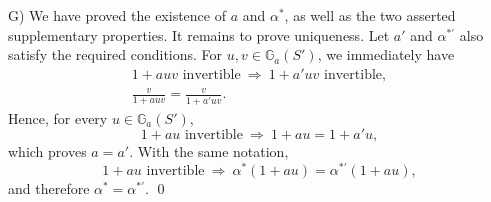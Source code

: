 \textup{G)} We have proved the existence of \(a\) and
\(\alpha^\ast\), as well as the two asserted supplementary
properties. It remains to prove uniqueness. Let
\(a'\) and \(\alpha^{\ast\prime}\) also satisfy the required
conditions. For \(u,v\in\mathbb G_a(S')\), we immediately have
\[
\begin{gathered}
  1+auv\text{ invertible}
    \ \Longrightarrow\
  1+a'uv\text{ invertible},\\
  \frac{v}{1+auv}=\frac{v}{1+a'uv}.
\end{gathered}
\]
Hence, for every \(u\in\mathbb G_a(S')\),
\[
  1+au\text{ invertible}
    \ \Longrightarrow\
  1+au=1+a'u,
\]
which proves \(a=a'\). With the same notation,
\[
  1+au\text{ invertible}
    \ \Longrightarrow\
  \alpha^\ast(1+au)=\alpha^{\ast\prime}(1+au),
\]
and therefore \(\alpha^\ast=\alpha^{\ast\prime}\).
\qed
